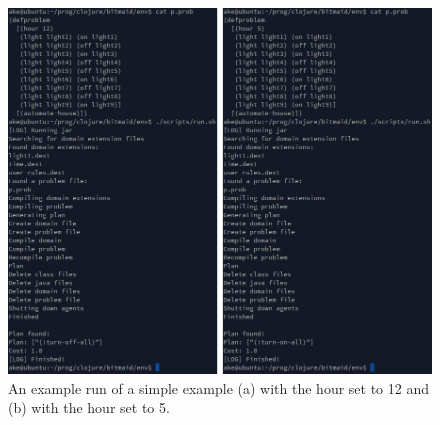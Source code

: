 \begin{figure}
  \centering
  \includegraphics[width=1\linewidth]{figures/house-example.png}
  \caption{An example run of a simple example (a) with the hour set to 12 and
    (b) with the hour set to 5.}
  \label{fig:house-example}
\end{figure}

